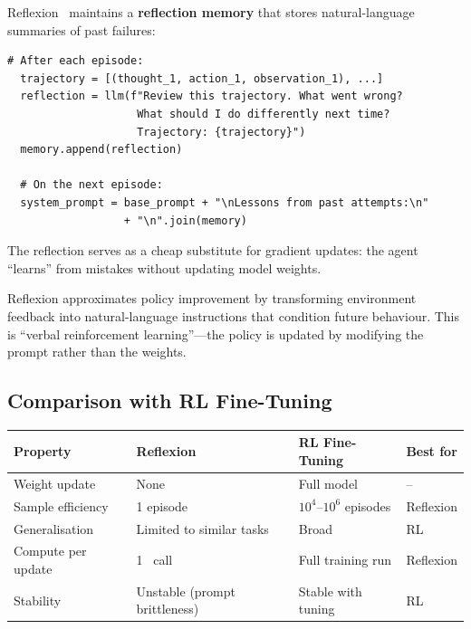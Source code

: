 Reflexion~\cite{shinn2023reflexion} maintains a \textbf{reflection memory} that stores natural-language summaries of past failures:

\begin{lstlisting}[caption=Reflexion architecture]
  # After each episode:
  trajectory = [(thought_1, action_1, observation_1), ...]
  reflection = llm(f"Review this trajectory. What went wrong?
                    What should I do differently next time?
                    Trajectory: {trajectory}")
  memory.append(reflection)

  # On the next episode:
  system_prompt = base_prompt + "\nLessons from past attempts:\n"
                  + "\n".join(memory)
\end{lstlisting}

The reflection serves as a cheap substitute for gradient updates: the agent ``learns'' from mistakes without updating model weights.

\begin{theorem}
	Reflexion approximates policy improvement by transforming environment feedback into natural-language instructions that condition future behaviour. This is ``verbal reinforcement learning''---the policy is updated by modifying the prompt rather than the weights.
\end{theorem}

\subsection{Comparison with RL Fine-Tuning}

\begin{longtable}{p{3.5cm}p{4cm}p{4cm}p{3cm}}
	\toprule
	\textbf{Property}  & \textbf{Reflexion}            & \textbf{RL Fine-Tuning} & \textbf{Best for} \\
	\midrule
	Weight update      & None                          & Full model              & --                \\
	Sample efficiency  & 1 episode                     & $10^4$--$10^6$ episodes & Reflexion         \\
	Generalisation     & Limited to similar tasks      & Broad                   & RL                \\
	Compute per update & 1 \llm\ call                  & Full training run       & Reflexion         \\
	Stability          & Unstable (prompt brittleness) & Stable with tuning      & RL                \\
	\bottomrule
\end{longtable}

